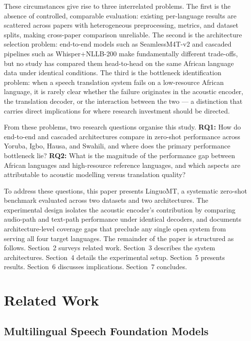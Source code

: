 \documentclass[10pt,twocolumn]{article}
\begin{document}
These circumstances give rise to three interrelated problems.
The first is the absence of controlled, comparable evaluation:
existing per-language results are scattered across papers with
heterogeneous preprocessing, metrics, and dataset splits,
making cross-paper comparison unreliable.
The second is the architecture selection problem: end-to-end
models such as SeamlessM4T-v2 and cascaded pipelines such as
Whisper+NLLB-200 make fundamentally different trade-offs,
but no study has compared them head-to-head on the same
African language data under identical conditions.
The third is the bottleneck identification problem: when a
speech translation system fails on a low-resource African
language, it is rarely clear whether the failure originates in
the acoustic encoder, the translation decoder, or the interaction
between the two --- a distinction that carries direct implications
for where research investment should be directed.

From these problems, two research questions organise this study.
\textbf{RQ1:} How do end-to-end and cascaded architectures compare
in zero-shot performance across Yoruba, Igbo, Hausa, and Swahili,
and where does the primary performance bottleneck lie?
\textbf{RQ2:} What is the magnitude of the performance gap between
African languages and high-resource reference languages, and which
aspects are attributable to acoustic modelling versus translation quality?

To address these questions, this paper presents LinguoMT, a
systematic zero-shot benchmark evaluated across two datasets
and two architectures.
The experimental design isolates the acoustic encoder's contribution
by comparing audio-path and text-path performance under identical
decoders, and documents architecture-level coverage gaps that
preclude any single open system from serving all four target languages.
The remainder of the paper is structured as follows.
Section~2 surveys related work. Section~3 describes the system
architectures. Section~4 details the experimental setup.
Section~5 presents results. Section~6 discusses implications.
Section~7 concludes.

\section{Related Work}

\subsection{Multilingual Speech Foundation Models}
\end{document}
